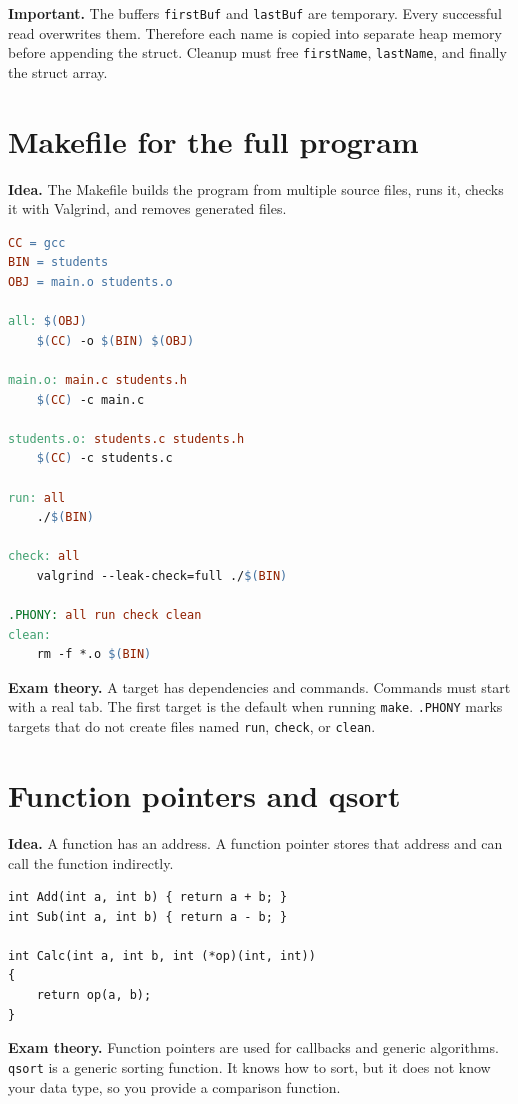 \documentclass[10pt,a4paper]{article}
\newcommand{\idea}{\noindent\textbf{\textcolor{accentdark}{Idea.}} }
\newcommand{\theory}{\noindent\textbf{\textcolor{accentdark}{Exam theory.}} }
\newcommand{\important}[1]{\par\smallskip\noindent\colorbox{softyellow}{\parbox{\dimexpr\linewidth-2\fboxsep}{\textbf{\textcolor{accentdark}{Important.}} #1}}\par\smallskip}
\begin{document}
\important{The buffers \texttt{firstBuf} and \texttt{lastBuf} are temporary. Every successful read overwrites them. Therefore each name is copied into separate heap memory before appending the struct. Cleanup must free \texttt{firstName}, \texttt{lastName}, and finally the struct array.}

\section{Makefile for the full program}
\idea The Makefile builds the program from multiple source files, runs it, checks it with Valgrind, and removes generated files.

\begin{lstlisting}[language=make,caption={Makefile}]
CC = gcc
BIN = students
OBJ = main.o students.o

all: $(OBJ)
	$(CC) -o $(BIN) $(OBJ)

main.o: main.c students.h
	$(CC) -c main.c

students.o: students.c students.h
	$(CC) -c students.c

run: all
	./$(BIN)

check: all
	valgrind --leak-check=full ./$(BIN)

.PHONY: all run check clean
clean:
	rm -f *.o $(BIN)
\end{lstlisting}

\theory A target has dependencies and commands. Commands must start with a real tab. The first target is the default when running \texttt{make}. \texttt{.PHONY} marks targets that do not create files named \texttt{run}, \texttt{check}, or \texttt{clean}.

\section{Function pointers and qsort}
\idea A function has an address. A function pointer stores that address and can call the function indirectly.

\begin{lstlisting}[caption={Function pointer as parameter}]
int Add(int a, int b) { return a + b; }
int Sub(int a, int b) { return a - b; }

int Calc(int a, int b, int (*op)(int, int))
{
    return op(a, b);
}
\end{lstlisting}

\theory Function pointers are used for callbacks and generic algorithms. \texttt{qsort} is a generic sorting function. It knows how to sort, but it does not know your data type, so you provide a comparison function.
\end{document}

